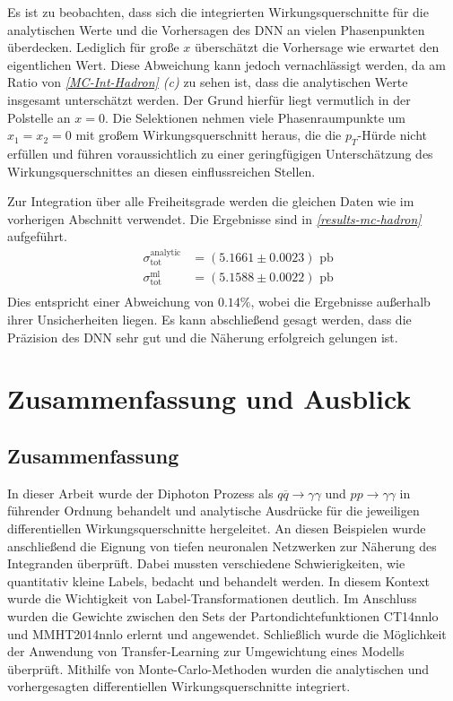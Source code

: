 Es ist zu beobachten, dass sich die integrierten Wirkungsquerschnitte für die analytischen Werte und die Vorhersagen des DNN an vielen Phasenpunkten überdecken. Lediglich für große $x$ überschätzt die Vorhersage wie erwartet den eigentlichen Wert. Diese Abweichung kann jedoch vernachlässigt werden, da am Ratio von \textit{\autoref{MC-Int-Hadron} (c)}  zu sehen ist, dass die analytischen Werte insgesamt unterschätzt werden. Der Grund hierfür liegt vermutlich in der Polstelle an $x=0$. Die Selektionen nehmen viele Phasenraumpunkte um $x_1 = x_2 = 0$ mit großem Wirkungsquerschnitt heraus, die die $p_T$-Hürde nicht erfüllen und führen voraussichtlich zu einer geringfügigen Unterschätzung des Wirkungsquerschnittes an diesen einflussreichen Stellen. 

Zur Integration über alle Freiheitsgrade werden die gleichen Daten wie im vorherigen Abschnitt verwendet. Die Ergebnisse sind in \textit{\autoref{results-mc-hadron}} aufgeführt.
\begin{equation}
\label{results-mc-hadron}
\begin{aligned}
&\sigma_{\text{tot}}^{\text{analytic}}&=  (5.1661 \pm 0.0023) \text{ pb}\\
&\sigma_{\text{tot}}^{\text{ml}} &= (5.1588 \pm 0.0022) \text{ pb} \\
\end{aligned}
\end{equation}
Dies entspricht einer Abweichung von $0.14\%$, wobei die Ergebnisse außerhalb ihrer Unsicherheiten liegen. Es kann abschließend gesagt werden, dass die Präzision des DNN sehr gut und die Näherung erfolgreich gelungen ist.   
\chapter{Zusammenfassung und Ausblick}
\label{5}
\section{Zusammenfassung}
In dieser Arbeit wurde der Diphoton Prozess als $q\overline{q} \rightarrow \gamma \gamma$ und $pp \rightarrow \gamma \gamma$ in führender Ordnung behandelt und analytische Ausdrücke für die jeweiligen differentiellen Wirkungsquerschnitte hergeleitet. An diesen Beispielen wurde anschließend die Eignung von tiefen neuronalen Netzwerken zur Näherung des Integranden überprüft. Dabei mussten verschiedene Schwierigkeiten, wie quantitativ kleine Labels, bedacht und behandelt werden. In diesem Kontext wurde die Wichtigkeit von Label-Transformationen deutlich. Im Anschluss wurden die Gewichte zwischen den Sets der Partondichtefunktionen CT14nnlo und MMHT2014nnlo erlernt und angewendet. Schließlich wurde die Möglichkeit der Anwendung von Transfer-Learning zur Umgewichtung eines Modells überprüft. Mithilfe von Monte-Carlo-Methoden wurden die analytischen und vorhergesagten differentiellen Wirkungsquerschnitte integriert.

